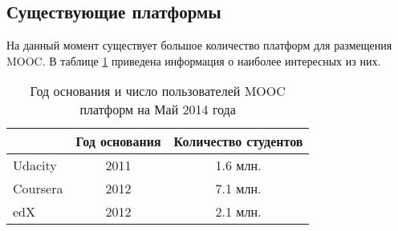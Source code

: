 \documentclass{matmex-diploma-custom}
\begin{document}
\subsection*{Существующие платформы}

На данный момент существует большое количество платформ для размещения
MOOC. В таблице \ref{table:platforms} приведена информация о наиболее
интересных из них.

\begin{table}[t]
  \centering
\begin{tabular}{|l|c|c|}
\hline
 & Год основания & Количество студентов \\
\hline
Udacity & 2011 & 1.6 млн. \\
Coursera & 2012 & 7.1 млн. \\
edX & 2012 & 2.1 млн. \\
\hline
\end{tabular}
  \caption{Год основания и число пользователей MOOC платформ на Май
    2014 года}
   \label{table:platforms}
\end{table}

\iffalse
#+ORGTBL: SEND plat orgtbl-to-latex :splice nil :skip 0
|----------+---------------+----------------------------------|
|          | Год основания | Количество студентов             |
|----------+---------------+----------------------------------|
| Udacity  |          2011 | 1.6 млн.                         |
| Coursera |          2012 | 7.1 млн.                         |
| edX      |          2012 | 2.1 млн.                         |
|----------+---------------+----------------------------------|
\fi
\end{document}
